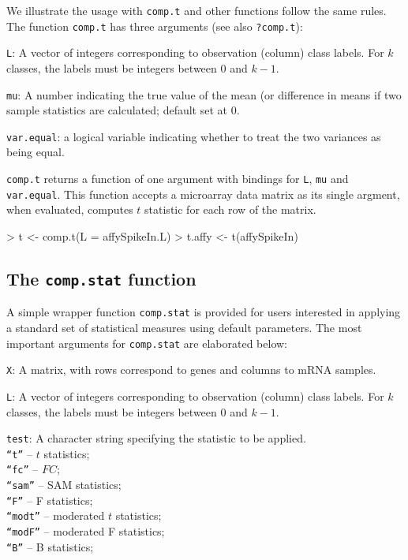 \documentclass[11pt]{article}
\newcommand{\code}[1]{{\tt #1}}
\newcommand{\Rfunc}[1]{{\tt #1}}
\begin{document}
We illustrate the usage with \Rfunc{comp.t} and other functions follow the 
same rules. The function \Rfunc{comp.t} has 
three arguments (see also {\tt ?comp.t}):
\begin{description}
  \item 
    {{\tt L}: }{ A vector of integers corresponding to observation (column)
    class labels. For $k$ classes, the labels must be integers
    between 0 and $k-1$.}
  \item
    {{\tt mu}: }{ A number indicating the true value of the mean (or
    difference in means if two sample statistics are calculated; default set 
    at 0.}
  \item
    {{\tt var.equal}: }{ a logical variable indicating whether to treat the
     two variances as being equal.}
\end{description}
{\tt comp.t} returns a function of one argument with bindings for
{\tt L}, {\tt mu} and {\tt var.equal}. This function accepts a
microarray data matrix as its single argment, when evaluated, computes
$t$ statistic for each row of the matrix.

\begin{Schunk}
\begin{Sinput}
> t <- comp.t(L = affySpikeIn.L)
> t.affy <- t(affySpikeIn)
\end{Sinput}
\end{Schunk}

\subsection{The \Rfunc{comp.stat} function}
A simple wrapper function \Rfunc{comp.stat} is provided for users interested 
in applying a standard set of statistical measures using default parameters. 
The most important arguments for \Rfunc{comp.stat} are elaborated below:

\begin{description}
\item
  {\code{X}: }{ A  matrix, with rows correspond to genes and columns
          to mRNA samples. }
\item
  {\code{L}: }{ A vector of integers corresponding to observation (column)
          class labels. For $k$ classes, the labels must be integers
          between 0 and $k-1$. }
\item
  {\code{test}: }{ A character string specifying the statistic to be applied.\\
    \code{``t''} -- $t$ statistics;\\
    \code{``fc''} -- $FC$;\\
    \code{``sam''} -- SAM statistics;\\
    \code{``F''} -- F statistics;\\
    \code{``modt''} -- moderated $t$ statistics;\\
    \code{``modF''} -- moderated F statistics;\\
    \code{``B''} -- B statistics;}
\end{description}
\end{document}
